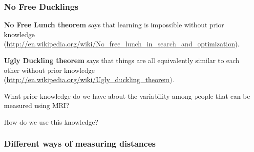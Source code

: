 \begin{frame}
\frametitle{No Free Ducklings}
{\bf No Free Lunch theorem} says that learning is impossible without prior knowledge (\url{http://en.wikipedia.org/wiki/No\_free\_lunch\_in\_search\_and\_optimization}).

{\bf Ugly Duckling theorem} says that things are all equivalently similar to each other without prior knowledge (\url{http://en.wikipedia.org/wiki/Ugly\_duckling\_theorem}).

\vspace{1cm}
What prior knowledge do we have about the variability among people that can be measured using MRI?

How do we use this knowledge?
\end{frame}

\begin{frame}
\frametitle{Different ways of measuring distances}
\begin{columns}[c]

\end{columns}
\end{frame}
